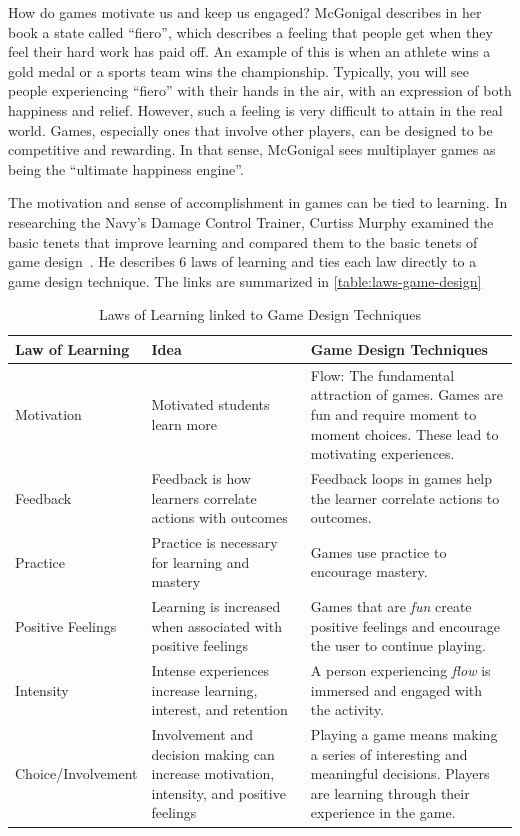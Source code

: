 How do games motivate us and keep us engaged? McGonigal describes in her book a state called ``fiero'', which describes a feeling that people get when they feel their hard work has paid off. An example of this is when an athlete wins a gold medal or a sports team wins the championship. Typically, you will see people experiencing ``fiero'' with their hands in the air, with an expression of both happiness and relief. However, such a feeling is very difficult to attain in the real world. Games, especially ones that involve other players, can be designed to be competitive and rewarding. In that sense, McGonigal sees multiplayer games as being the ``ultimate happiness engine''.

The motivation and sense of accomplishment in games can be tied to learning. In researching the Navy's Damage Control Trainer, Curtiss Murphy examined the basic tenets that improve learning and compared them to the basic tenets of game design~\cite{murphy-science-learning}. He describes 6 laws of learning and ties each law directly to a game design technique. The links are summarized in \autoref{table:laws-game-design}

\begin{table}[t!]
	\begin{tabular}{| l | p{4cm} | p{7cm} |}
		\hline
		Law of Learning & Idea & Game Design Techniques \\
		\hline
		Motivation & Motivated students learn more & Flow: The fundamental attraction of games. Games are fun and require moment to moment choices. These lead to motivating experiences. \\
		Feedback & Feedback is how learners correlate actions with outcomes & Feedback loops in games help the learner correlate actions to outcomes. \\
		Practice & Practice is necessary for learning and mastery & Games use practice to encourage mastery.\\
		Positive Feelings & Learning is increased when associated with positive feelings & Games that are \emph{fun} create positive feelings and encourage the user to continue playing.\\
		Intensity & Intense experiences increase learning, interest, and retention & A person experiencing \emph{flow} is immersed and engaged with the activity.\\
		Choice/Involvement & Involvement and decision making can increase motivation, intensity, and positive feelings & Playing a game means making a series of interesting and meaningful decisions. Players are learning through their experience in the game.\\
	\hline
	\end{tabular}
	\caption{Laws of Learning linked to Game Design Techniques}
	\label{table:laws-game-design}
\end{table}

